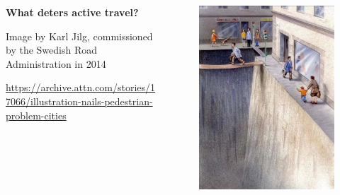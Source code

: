 \documentclass[aspectratio=169]{beamer}
\begin{document}
\begin{frame}
	\begin{columns}
		\begin{column}{0.5\textwidth}
			
			\textbf{What deters active travel?}
			
			\vspace{8mm}
			
			\tiny{Image by Karl Jilg, commissioned by the Swedish Road Administration in 2014}
				
			\tiny\url{https://archive.attn.com/stories/17066/illustration-nails-pedestrian-problem-cities}
			
		\end{column}
		
		\begin{column}{0.5\textwidth}
			\begin{figure}
				\centering
				\includegraphics[width=0.9\linewidth]{images/deter_active_travel.jpg}
			\end{figure}
			
		\end{column}
		
		
		
	\end{columns}
\end{frame}
\end{document}
